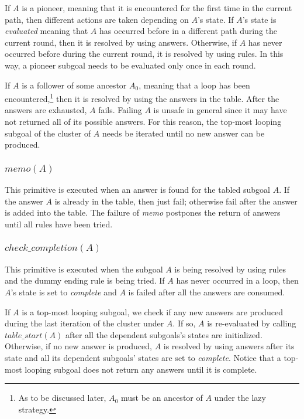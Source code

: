 \documentclass{tlp}
\begin{document}
If $A$ is a pioneer, meaning that it is encountered for the first time in the current path, then different actions are taken depending on $A$'s state. If $A$'s state is {\it evaluated} meaning that $A$ has occurred before in a different path during the current round, then it is resolved by using answers. Otherwise, if $A$ has never occurred before during the current round, it is resolved by using rules. In this way, a pioneer subgoal needs to be evaluated only once in each round.

If $A$ is a follower of some ancestor $A_0$, meaning that a loop has been encountered,\footnote{As to be discussed later, $A_0$ must be an ancestor of $A$ under the lazy strategy.} then it is resolved by using the answers in the table. After the answers are exhausted, $A$ fails. Failing $A$ is unsafe in general since it may have not returned all of its possible answers. For this reason, the top-most looping subgoal of the cluster of $A$ needs be iterated until no new answer can be produced.

\subsubsection{$memo(A)$}
This primitive is executed when an answer is found for the tabled subgoal $A$. If the answer $A$ is already in the table, then just fail; otherwise fail after the answer is added into the table. The failure of {\it memo} postpones the return of answers until all rules have been tried.

\subsubsection{\label{sub:evaluated}$check\_completion(A)$}
This primitive is executed when the subgoal $A$ is being resolved by using rules and the dummy ending rule is being tried. If $A$ has never occurred in a loop, then $A$'s state is set to {\it complete} and $A$ is failed after all the answers are consumed. 

If $A$ is a top-most looping subgoal, we check if any new answers are produced during the last iteration of the cluster under $A$. If so, $A$ is re-evaluated by calling $table\_start(A)$ after all the dependent subgoals's states are initialized. Otherwise, if no new answer is produced, $A$ is resolved by using answers after its state and all its dependent subgoals' states are set to {\it complete}. Notice that a top-most looping subgoal does not return any answers until it is complete.
\end{document}
